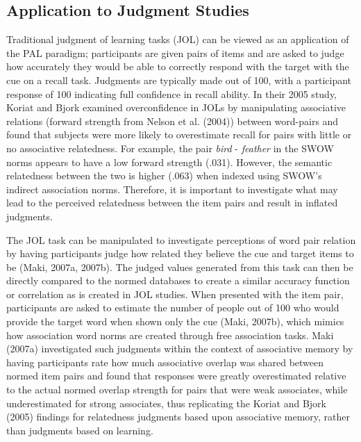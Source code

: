 \documentclass[english,,man]{apa6}
\begin{document}
\hypertarget{application-to-judgment-studies}{%
\subsection{Application to Judgment Studies}\label{application-to-judgment-studies}}

Traditional judgment of learning tasks (JOL) can be viewed as an application of the PAL paradigm; participants are given pairs of items and are asked to judge how accurately they would be able to correctly respond with the target with the cue on a recall task. Judgments are typically made out of 100, with a participant response of 100 indicating full confidence in recall ability. In their 2005 study, Koriat and Bjork examined overconfidence in JOLs by manipulating associative relations (forward strength from Nelson et al. (2004)) between word-pairs and found that subjects were more likely to overestimate recall for pairs with little or no associative relatedness. For example, the pair \emph{bird} - \emph{feather} in the SWOW norms appears to have a low forward strength (.031). However, the semantic relatedness between the two is higher (.063) when indexed using SWOW's indirect association norms. Therefore, it is important to investigate what may lead to the perceived relatedness between the item pairs and result in inflated judgments.

The JOL task can be manipulated to investigate perceptions of word pair relation by having participants judge how related they believe the cue and target items to be (Maki, 2007a, 2007b). The judged values generated from this task can then be directly compared to the normed databases to create a similar accuracy function or correlation as is created in JOL studies. When presented with the item pair, participants are asked to estimate the number of people out of 100 who would provide the target word when shown only the cue (Maki, 2007b), which mimics how association word norms are created through free association tasks. Maki (2007a) investigated such judgments within the context of associative memory by having participants rate how much associative overlap was shared between normed item pairs and found that responses were greatly overestimated relative to the actual normed overlap strength for pairs that were weak associates, while underestimated for strong associates, thus replicating the Koriat and Bjork (2005) findings for relatedness judgments based upon associative memory, rather than judgments based on learning.
\end{document}
